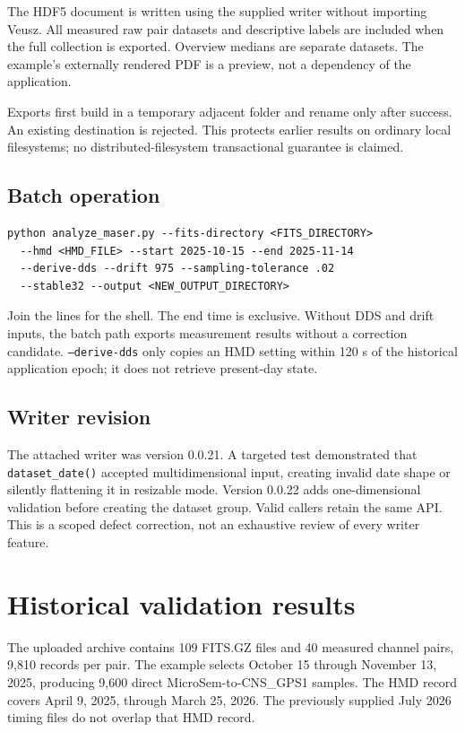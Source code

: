 \documentclass[11pt,a4paper]{article}
\begin{document}
The HDF5 document is written using the supplied writer without importing
Veusz. All measured raw pair datasets and descriptive labels are included when
the full collection is exported. Overview medians are separate datasets.
The example's externally rendered PDF is a preview, not a dependency of the
application.

Exports first build in a temporary adjacent folder and rename only after
success. An existing destination is rejected. This protects earlier results
on ordinary local filesystems; no distributed-filesystem transactional
guarantee is claimed.

\subsection{Batch operation}
\begin{lstlisting}
python analyze_maser.py --fits-directory <FITS_DIRECTORY>
  --hmd <HMD_FILE> --start 2025-10-15 --end 2025-11-14
  --derive-dds --drift 975 --sampling-tolerance .02
  --stable32 --output <NEW_OUTPUT_DIRECTORY>
\end{lstlisting}
Join the lines for the shell. The end time is exclusive. Without DDS and drift
inputs, the batch path exports measurement results without a correction
candidate. \texttt{--derive-dds} only copies an HMD setting within 120 s of the
historical application epoch; it does not retrieve present-day state.

\subsection{Writer revision}
The attached writer was version 0.0.21. A targeted test demonstrated that
\texttt{dataset\_date()} accepted multidimensional input, creating invalid
date shape or silently flattening it in resizable mode. Version 0.0.22 adds
one-dimensional validation before creating the dataset group. Valid callers
retain the same API. This is a scoped defect correction, not an exhaustive
review of every writer feature.
\clearpage

\section{Historical validation results}
The uploaded archive contains 109 FITS.GZ files and 40 measured channel pairs,
9,810 records per pair. The example selects October 15 through November 13,
2025, producing 9,600 direct MicroSem-to-CNS\_GPS1 samples. The HMD record covers
April 9, 2025, through March 25, 2026. The previously supplied July 2026 timing
files do not overlap that HMD record.
\end{document}
